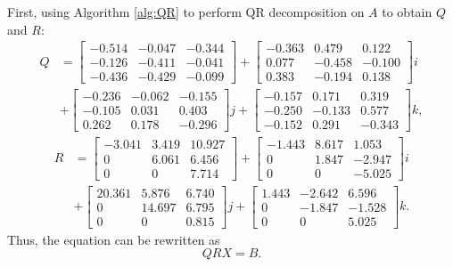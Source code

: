 \documentclass{book}
\theoremstyle{remark}
\begin{document}
\begin{multicols}{2}
First, using Algorithm \ref{alg:QR} to perform QR decomposition on $A$ to obtain $Q$ and $R:$
\setlength{\jot}{2pt}
\setlength{\arraycolsep}{1pt}
\begin{align*}
  Q &=
     \begin{bmatrix}
    -0.514 & -0.047 & -0.344 \\
    -0.126 & -0.411 & -0.041 \\
    -0.436 & -0.429 & -0.099
    \end{bmatrix} +
    \begin{bmatrix}
    -0.363 &  0.479 &  0.122 \\
     0.077 & -0.458 & -0.100 \\
     0.383 & -0.194 &  0.138
    \end{bmatrix} i \\
    & + 
    \begin{bmatrix}
    -0.236 & -0.062 & -0.155 \\
    -0.105 &  0.031 &  0.403 \\
     0.262 &  0.178 & -0.296
    \end{bmatrix} j +
    \begin{bmatrix}
    -0.157 &  0.171 &  0.319 \\
    -0.250 & -0.133 &  0.577 \\
    -0.152 &  0.291 & -0.343
    \end{bmatrix} k,
\end{align*}
\begin{align*}
  R &=
     \begin{bmatrix}
    -3.041 & 3.419 & 10.927 \\
     0     & 6.061 & 6.456 \\
     0     & 0     & 7.714
    \end{bmatrix} +
    \begin{bmatrix}
    -1.443 & 8.617 &  1.053 \\
     0     & 1.847 & -2.947 \\
     0     & 0     & -5.025
    \end{bmatrix} i \\
    &+ 
    \begin{bmatrix}
    20.361 & 5.876  & 6.740 \\
     0     & 14.697 & 6.795 \\
     0     & 0      & 0.815
    \end{bmatrix} j +
    \begin{bmatrix}
    1.443 & -2.642 &  6.596 \\
    0     & -1.847 & -1.528 \\
    0     &  0     &  5.025
    \end{bmatrix} k.
\end{align*}
Thus, the equation can be rewritten as
\begin{equation}
    QRX = B.\label{eq:example1}
\end{equation}


\end{multicols}
\end{document}
